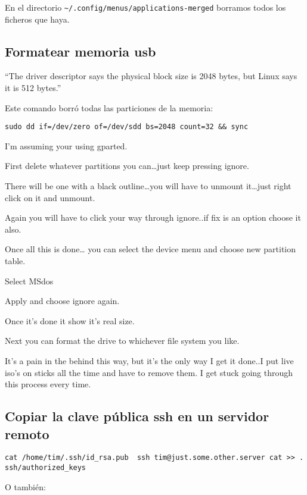 \documentclass[
  12pt,
  spanish,
]{article}
\begin{document}
En el directorio
\texttt{\textasciitilde{}/.config/menus/applications-merged} borramos
todos los ficheros que haya.

\hypertarget{formatear-memoria-usb}{%
\subsection{Formatear memoria usb}\label{formatear-memoria-usb}}

``The driver descriptor says the physical block size is 2048 bytes, but
Linux says it is 512 bytes.''

Este comando borró todas las particiones de la memoria:

\texttt{sudo\ dd\ if=/dev/zero\ of=/dev/sdd\ bs=2048\ count=32\ \&\&\ sync}

I'm assuming your using gparted.

First delete whatever partitions you can\ldots just keep pressing
ignore.

There will be one with a black outline\ldots you will have to unmount
it\ldots just right click on it and unmount.

Again you will have to click your way through ignore..if fix is an
option choose it also.

Once all this is done\ldots{} you can select the device menu and choose
new partition table.

Select MSdos

Apply and choose ignore again.

Once it's done it show it's real size.

Next you can format the drive to whichever file system you like.

It's a pain in the behind this way, but it's the only way I get it
done..I put live iso's on sticks all the time and have to remove them. I
get stuck going through this process every time.

\hypertarget{copiar-la-clave-puxfablica-ssh-en-un-servidor-remoto}{%
\subsection{Copiar la clave pública ssh en un servidor
remoto}\label{copiar-la-clave-puxfablica-ssh-en-un-servidor-remoto}}

\texttt{cat\ /home/tim/.ssh/id\_rsa.pub\ \textbar{}\ ssh\ tim@just.some.other.server\ \textquotesingle{}cat\ \textgreater{}\textgreater{}\ .ssh/authorized\_keys\textquotesingle{}}

O también:
\end{document}
